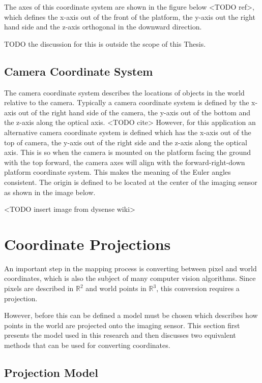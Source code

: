The axes of this coordinate system are shown in the figure below <TODO ref>, which defines the x-axis out of the front of the platform, the y-axis out the right hand side and the z-axis orthogonal in the downward direction.  

TODO the discussion for this is outside the scope of this Thesis. 

\subsection{Camera Coordinate System}

The camera coordinate system describes the locations of objects in the world relative to the camera.  Typically a camera coordinate system is defined by the x-axis out of the right hand side of the camera, the y-axis out of the bottom and the z-axis along the optical axis.  <TODO cite>   However, for this application an alternative camera coordinate system is defined which has the x-axis out of the top of camera, the y-axis out of the right side and the z-axis along the optical axis.  This is so when the camera is mounted on the platform facing the ground with the top forward, the camera axes will align with the forward-right-down platform coordinate system.  This makes the meaning of the Euler angles consistent.  The origin is defined to be located at the center of the imaging sensor as shown in the image below.

<TODO insert image from dysense wiki>

\section{Coordinate Projections}
 
 An important step in the mapping process is converting between pixel and world coordinates, which is also the subject of many computer vision algorithms.  Since pixels are described in $\mathbb{R}^2$ and world points in $\mathbb{R}^3$, this conversion requires a projection.  
 
 However, before this can be defined a model must be chosen which describes how points in the world are projected onto the imaging sensor.  This section first presents the model used in this research and then discusses two equivalent methods that can be used for converting coordinates.  
 
 \subsection{Projection Model}
 
